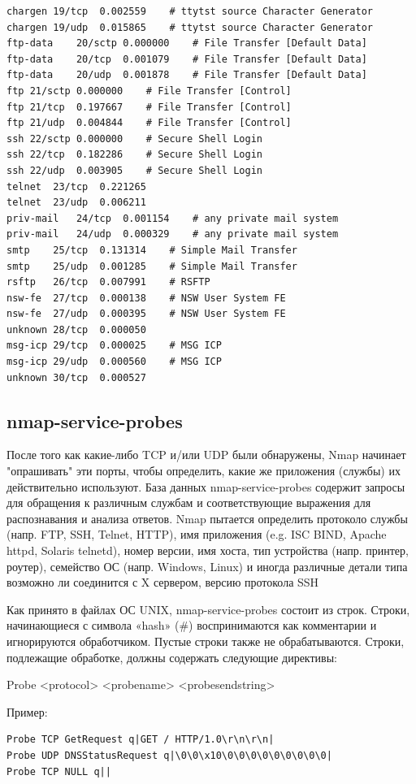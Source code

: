 \documentclass[12pt,a4paper]{report}
\begin{document}
\begin{lstlisting}[breaklines]
chargen	19/tcp	0.002559	# ttytst source Character Generator
chargen	19/udp	0.015865	# ttytst source Character Generator
ftp-data	20/sctp	0.000000	# File Transfer [Default Data]
ftp-data	20/tcp	0.001079	# File Transfer [Default Data]
ftp-data	20/udp	0.001878	# File Transfer [Default Data]
ftp	21/sctp	0.000000	# File Transfer [Control]
ftp	21/tcp	0.197667	# File Transfer [Control]
ftp	21/udp	0.004844	# File Transfer [Control]
ssh	22/sctp	0.000000	# Secure Shell Login
ssh	22/tcp	0.182286	# Secure Shell Login
ssh	22/udp	0.003905	# Secure Shell Login
telnet	23/tcp	0.221265
telnet	23/udp	0.006211
priv-mail	24/tcp	0.001154	# any private mail system
priv-mail	24/udp	0.000329	# any private mail system
smtp	25/tcp	0.131314	# Simple Mail Transfer
smtp	25/udp	0.001285	# Simple Mail Transfer
rsftp	26/tcp	0.007991	# RSFTP
nsw-fe	27/tcp	0.000138	# NSW User System FE
nsw-fe	27/udp	0.000395	# NSW User System FE
unknown	28/tcp	0.000050
msg-icp	29/tcp	0.000025	# MSG ICP
msg-icp	29/udp	0.000560	# MSG ICP
unknown	30/tcp	0.000527
\end{lstlisting}



\subsection*{nmap-service-probes}

После того как какие-либо TCP и/или UDP были обнаружены, Nmap начинает "опрашивать" эти порты, чтобы определить, какие же приложения (службы) их действительно используют. База данных nmap-service-probes содержит запросы для обращения к различным службам и соответствующие выражения для распознавания и анализа ответов. Nmap пытается определить протоколо службы (напр. FTP, SSH, Telnet, HTTP), имя приложения (e.g. ISC BIND, Apache httpd, Solaris telnetd), номер версии, имя хоста, тип устройства (напр. принтер, роутер), семейство ОС (напр. Windows, Linux) и иногда различные детали типа возможно ли соединится с X сервером, версию протокола SSH

Как принято в файлах ОС UNIX, nmap-service-probes состоит из строк. Строки, начинающиеся с символа «hash» (\#) воспринимаются как комментарии и игнорируются обработчиком. Пустые строки также не обрабатываются. Строки, подлежащие обработке, должны содержать следующие директивы:

Probe <protocol> <probename> <probesendstring>

Пример:
\begin{lstlisting}[breaklines]
Probe TCP GetRequest q|GET / HTTP/1.0\r\n\r\n|
Probe UDP DNSStatusRequest q|\0\0\x10\0\0\0\0\0\0\0\0\0|
Probe TCP NULL q||
\end{lstlisting}
\end{document}
